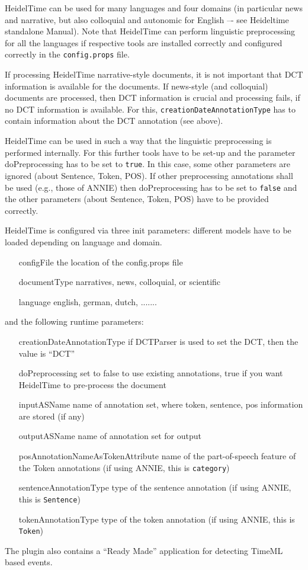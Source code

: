 HeidelTime can be used for many languages and four domains (in particular news
and narrative, but also colloquial and autonomic for English –- see
Heideltime standalone Manual). Note that HeidelTime can perform linguistic
preprocessing for all the languages if respective tools are installed correctly
and configured correctly in the \verb!config.props! file. 

If processing HeidelTime narrative-style documents, it is not important that
DCT information is available for the documents. If news-style (and colloquial)
documents are processed, then DCT information is crucial and processing fails,
if no DCT information is available. For this, \verb!creationDateAnnotationType!
has to contain information about the DCT annotation (see above).

HeidelTime can be used in such a way that the linguistic preprocessing is
performed internally. For this further tools have to be set-up and the
parameter doPreprocessing has to be set to \verb!true!. In this case, some
other parameters are ignored (about Sentence, Token, POS).  If other
preprocessing annotations shall be used (e.g., those of ANNIE) then
doPreprocessing has to be set to \verb!false! and the other parameters (about
Sentence, Token, POS) have to be provided correctly.

HeidelTime is configured via three init parameters:
different models have to be loaded depending on language and domain.

\begin{itemize}
\item[configFile] the location of the config.props file
\item[documentType] narratives, news, colloquial, or scientific
\item[language] english, german, dutch, .......
\end{itemize}

and the following runtime parameters:

\begin{itemize}
\item[creationDateAnnotationType] if DCTParser is used to set the DCT, then the value is ``DCT''
\item[doPreprocessing] set to false to use existing annotations, true if you want HeidelTime to pre-process the document
\item[inputASName] name of annotation set, where token, sentence, pos information are stored (if any)
\item[outputASName] name of annotation set for output
\item[posAnnotationNameAsTokenAttribute] name of the part-of-speech feature of the Token annotations (if using ANNIE, this is \verb!category!)
\item[sentenceAnnotationType] type of the sentence annotation (if using ANNIE, this is \verb!Sentence!)
\item[tokenAnnotationType] type of the token annotation (if using ANNIE, this is \verb!Token!)
\end{itemize}


The plugin also contains a ``Ready Made'' application for detecting TimeML based events.
